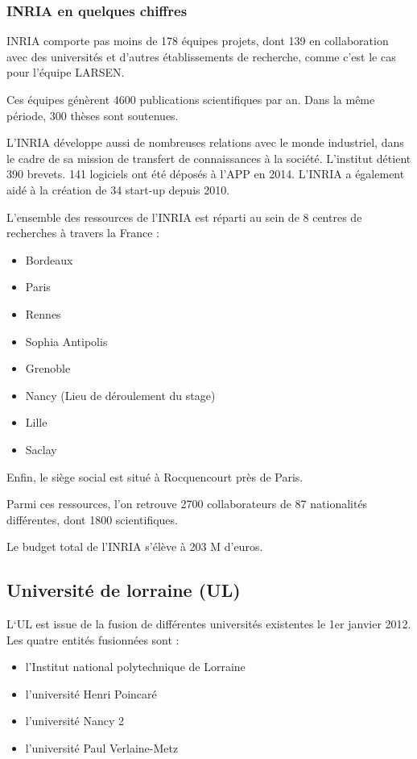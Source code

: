 \documentclass{tnreport}
\begin{document}
\subsubsection{INRIA en quelques chiffres}
\gls{INRIA} comporte pas moins de 178 équipes projets, dont 139 en collaboration avec des universités et d'autres établissements de recherche, comme c'est le cas pour l'équipe \gls{LARSEN}.

Ces équipes génèrent 4600 publications scientifiques par an. Dans la même période, 300 thèses sont soutenues.

L'\gls{INRIA} développe aussi de nombreuses relations avec le monde industriel, dans le cadre de sa mission de transfert de connaissances à la société. L'institut détient 390 brevets. 141 logiciels ont été déposés à l'\gls{APP} en 2014. L'\gls{INRIA} a également aidé à la création de 34 start-up depuis 2010.

L'ensemble des ressources de l'\gls{INRIA} est réparti au sein de 8 centres de recherches à travers la France :
\begin{itemize}
    \item Bordeaux
    \item Paris
    \item Rennes
    \item Sophia Antipolis
    \item Grenoble
    \item Nancy (Lieu de déroulement du stage)
    \item Lille
    \item Saclay
\end{itemize}

Enfin, le siège social est situé à Rocquencourt près de Paris. 

Parmi ces ressources, l'on retrouve 2700 collaborateurs de 87 nationalités différentes, dont 1800 scientifiques. 

Le budget total de l'\gls{INRIA} s'élève à 203 M d'euros.


\subsection{Université de lorraine (UL)}

L`\gls{UL} est issue de la fusion de différentes universités existentes le 1er janvier 2012. Les quatre entités fusionnées sont :
\begin{itemize}
    \item  l'Institut national polytechnique de Lorraine
    \item  l'université Henri Poincaré
    \item  l'université Nancy 2
    \item  l'université Paul Verlaine-Metz
\end{itemize}
\end{document}
